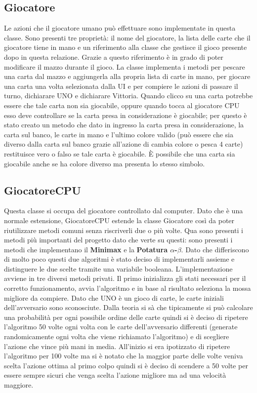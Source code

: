 	\subsection{Giocatore}
		Le azioni che il giocatore umano può effettuare sono implementate in questa classe. Sono presenti tre proprietà: il nome del giocatore, la lista delle carte che il giocatore tiene in mano e un riferimento alla classe che gestisce il gioco presente dopo in questa relazione. Grazie a questo riferimento è in grado di poter modificare il mazzo durante il gioco. La classe implementa i metodi per pescare una carta dal mazzo e aggiungerla alla propria lista di carte in mano, per giocare una carta una volta selezionata dalla UI e per compiere le azioni di passare il turno, dichiarare UNO e dichiarare Vittoria. Quando clicco su una carta potrebbe essere che tale carta non sia giocabile, oppure quando tocca al giocatore CPU esso deve controllare se la carta presa in considerazione è giocabile; per questo è stato creato un metodo che dato in ingresso la carta presa in considerazione, la carta sul banco, le carte in mano e l'ultimo colore valido (può essere che sia diverso dalla carta sul banco grazie all'azione di cambia colore o pesca 4 carte) restituisce vero o falso se tale carta è giocabile. È possibile che una carta sia giocabile anche se ha colore diverso ma presenta lo stesso simbolo.
		
	\subsection{GiocatoreCPU}	
		Questa classe si occupa del giocatore controllato dal computer. Dato che è una normale estensione, GiocatoreCPU estende la classe Giocatore così da poter riutilizzare metodi comuni senza riscriverli due o più volte. Qua sono presenti i metodi più importanti del progetto dato che verte su questi: sono presenti i metodi che implementano il \textbf{Minimax} e la \textbf{Potatura $\alpha$-$\beta$}. Dato che differiscono di molto poco questi due algoritmi è stato deciso di implementarli assieme e distinguere le due scelte tramite una variabile booleana. L'implementazione avviene in tre diversi metodi privati. Il primo inizializza gli stati necessari per il corretto funzionamento, avvia l'algoritmo e in base al risultato seleziona la mossa migliore da compiere. Dato che UNO è un gioco di carte, le carte iniziali dell'avversario sono sconosciute. Dalla teoria si sà che tipicamente si può calcolare una probabilità per ogni possibile ordine delle carte quindi si è deciso di ripetere l'algoritmo 50 volte ogni volta con le carte dell'avversario differenti (generate randomicamente ogni volta che viene richiamato l'algoritmo) e di scegliere l'azione che vince più mani in media. All'inizio si era ipotizzato di ripetere l'algoritmo per 100 volte ma si è notato che la maggior parte delle volte veniva scelta l'azione ottima al primo colpo quindi si è deciso di scendere a 50 volte per essere sempre sicuri che venga scelta l'azione migliore ma ad una velocità maggiore. \\
		

